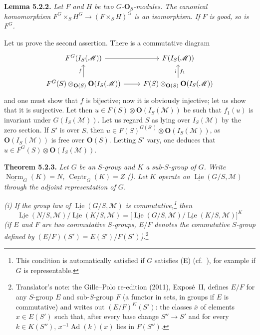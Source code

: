 \medskip
\noindent{}\textbf{Lemma 5.2.2.}
\textit{Let \(F\) and \(H\) be two \(G\)-\(\mathbf O_S\)-modules. The
canonical homomorphism \(F^G\times_SH^G\to(F\times_SH)^G\) is an
isomorphism. If \(F\) is good, so is \(F^G\).}

Let us prove the second assertion. There is a commutative diagram
\[
\begin{tikzcd}
 F^G(I_S(\mathscr M)) \arrow[r] & F(I_S(\mathscr M))\\
 F^G(S)\otimes_{\mathbf O(S)}\mathbf O(I_S(\mathscr M)) \arrow[u,"f"] \arrow[r]
 & F(S)\otimes_{\mathbf O(S)}\mathbf O(I_S(\mathscr M)) \arrow[u,"f_1"',"\wr"]
\end{tikzcd}
\]
and one must show that \(f\) is bijective; now it is obviously injective;
let us show that it is surjective. Let then
\(u\in F(S)\otimes\mathbf O(I_S(\mathscr M))\) be such that \(f_1(u)\) is
invariant under \(G(I_S(\mathscr M))\). Let us regard \(S\) as lying over
\(I_S(\mathscr M)\) by the zero section. If \(S'\) is over \(S\), then
\(u\in F(S)^{G(S')}\otimes\mathbf O(I_S(\mathscr M))\), as
\(\mathbf O(I_S(\mathscr M))\) is free over \(\mathbf O(S)\). Letting
\(S'\) vary, one deduces that
\(u\in F^G(S)\otimes\mathbf O(I_S(\mathscr M))\).

\medskip
\noindent{}\textbf{Theorem 5.2.3.}
\textit{Let \(G\) be an \(S\)-group and \(K\) a sub-\(S\)-group of \(G\).
Write \(\underline{\operatorname{Norm}}_G(K)=N\),
\(\underline{\operatorname{Centr}}_G(K)=Z\)
(). Let \(K\) operate on
\(\underline{\operatorname{Lie}}(G/S,\mathscr M)\) through the adjoint
representation of \(G\).}

\textit{(i) If the group law of
\(\underline{\operatorname{Lie}}(G/S,\mathscr M)\) is
commutative,\footnote{This condition is automatically satisfied if \(G\)
satisfies (E) (cf.~), for example if \(G\) is representable.}
then}
\[
 \underline{\operatorname{Lie}}(N/S,\mathscr M)/
 \underline{\operatorname{Lie}}(K/S,\mathscr M)
 =
 \bigl[\underline{\operatorname{Lie}}(G/S,\mathscr M)/
 \underline{\operatorname{Lie}}(K/S,\mathscr M)\bigr]^K
\]
\textit{(if \(E\) and \(F\) are two commutative \(S\)-groups, \(E/F\)
denotes the commutative \(S\)-group defined by
\((E/F)(S')=E(S')/F(S')\)).}\footnote{Translator's note: the Gille--Polo
re-edition (2011), Expos\'e~II, defines \(E/F\) for any \(S\)-group \(E\)
and sub-\(S\)-group \(F\) (a functor in sets, in groups if \(E\) is
commutative) and writes out \((E/F)^K(S')\): the classes \(\bar x\) of
elements \(x\in E(S')\) such that, after every base change \(S''\to S'\)
and for every \(k\in K(S'')\), \(x^{-1}\operatorname{Ad}(k)(x)\) lies in
\(F(S'')\).}

